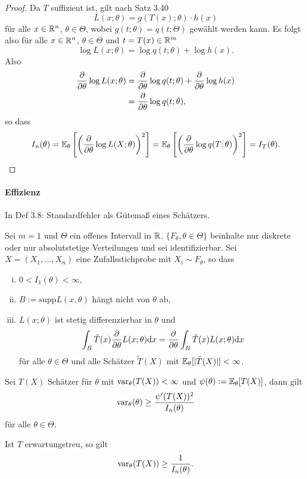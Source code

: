 \begin{proof}
  Da $T$ suffizient ist, gilt nach Satz 3.40
  \[ L(x; \theta) = g(T(x);\theta) \cdot h(x) \]
  für alle $x \in \mathbb{R}^n$, $\theta \in \Theta$, wobei $g(t;\theta) =
  q(t; \Theta)$ gewählt werden kann. Es folgt also für alle $x \in \mathbb{R}^n$,
  $\theta \in \Theta$ und $t = T(x) \in \mathbb{R}^m$
  \[ \log L(x; \theta) = \log q(t; \theta) + \log h(x). \]
  Also
  \begin{align*}
    \frac{\partial }{\partial \theta} \log L(x;\theta)
    &= \frac{\partial }{\partial \theta} \log q(t;\theta) + \frac{\partial }{\partial \theta} \log h(x) \\
    &= \frac{\partial }{\partial \theta} \log q(t;\theta),
  \end{align*}
  so dass
  \[ I_n(\theta) =
    \mathbb{E}_\theta \left[ \left( \frac{\partial }{\partial \theta} \log L(X;\theta) \right)^2 \right]
    =
    \mathbb{E}_\theta \left[ \left( \frac{\partial }{\partial \theta} \log q(T;\theta) \right)^2 \right]
    = I_T(\theta). \qedhere
  \]
\end{proof}

\paragraph{Effizienz}
In Def 3.8: Standardfehler als Gütemaß eines Schätzers.

\begin{thm} %
  Sei $m=1$ und $\Theta$ ein offenes Intervall in $\mathbb{R}$. $\{F_\theta,\theta
  \in \Theta\}$ beinhalte nur diskrete oder nur absolutstetige Verteilungen und
  sei identifizierbar. Sei $X=(X_1,\ldots,X_n)$ eine Zufallsstichprobe mit $X_i
  \sim F_\theta$, so dass
  \begin{enumerate}[(i)]
  \item $0 < I_1(\theta) < \infty$,
  \item $B := \mathrm{supp} L(x,\theta)$ hängt nicht von $\theta$ ab,
  \item $L(x;\theta)$ ist stetig differenzierbar in $\theta$ und
    \[ \int_B \tilde{T}(x) \frac{\partial }{\partial \theta} L(x;\theta) \mathrm{d} x =
      \frac{\partial }{\partial \theta} \int_B \tilde{T}(x) L(x;\theta) \mathrm{d} x \]
    für alle $\theta \in \Theta$ und alle Schätzer $\tilde{T}(X)$ mit
    $\mathbb{E}_\theta[|\tilde{T}(X)|] < \infty$.
  \end{enumerate}
  Sei $T(X)$ Schätzer für $\theta$ mit $\operatorname{var}_\theta(T(X)) < \infty$ und
  $\psi(\theta) := \mathbb{E}_\theta[T(X)]$,  dann gilt
  \[ \operatorname{var}_\theta(\theta) \ge \frac{\psi'(T(X))^2}{I_n(\theta)} \]
  für alle $\theta \in \Theta$.

  Ist $T$ erwartungstreu, so gilt
  \[ \operatorname{var}_\theta(T(X)) \ge \frac{1}{I_n(\theta)}. \]
\end{thm}

